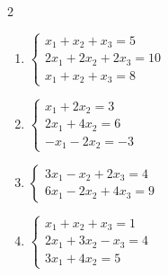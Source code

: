 \begin{multicols}{2}
\begin{enumerate}[label=\arabic*., leftmargin=*]
\item $\begin{cases}x_1+x_2+x_3=5\\2x_1+2x_2+2x_3=10\\x_1+x_2+x_3=8\end{cases}$

\item $\begin{cases}x_1+2x_2=3\\2x_1+4x_2=6\\-x_1-2x_2=-3\end{cases}$

\item $\begin{cases}3x_1-x_2+2x_3=4\\6x_1-2x_2+4x_3=9\end{cases}$

\item $\begin{cases}x_1+x_2+x_3=1\\2x_1+3x_2-x_3=4\\3x_1+4x_2=5\end{cases}$

\end{enumerate}
\end{multicols}